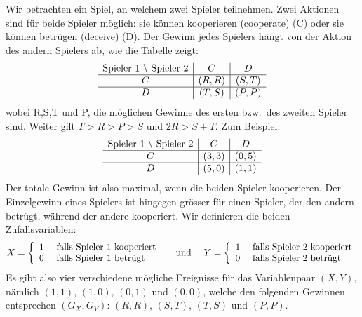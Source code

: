 \documentclass[12pt,a4paper]{article}
\begin{document}
Wir betrachten ein Spiel, an welchem zwei Spieler teilnehmen. Zwei Aktionen sind für beide Spieler möglich: sie können kooperieren (cooperate) (C) oder sie können betrügen (deceive) (D). Der Gewinn jedes Spielers hängt von der Aktion des andern Spielers ab, wie die Tabelle zeigt:
$$\begin{array}{c | c | c}
\text{Spieler 1 } \backslash \text{ Spieler 2} &  C & D \\
\hline
C &  (R,R) & (S,T) \\
\hline
D &  (T,S) & (P,P) \\
\end{array}$$
wobei R,S,T und P, die möglichen Gewinne des ersten bzw.\ des zweiten Spieler sind. Weiter gilt 
$T > R > P > S$ und $2R > S+T$. Zum Beispiel:
$$\begin{array}{c | c | c}
\text{Spieler 1 } \backslash \text{ Spieler 2} &  C & D \\
\hline
C &  (3,3) & (0,5) \\
\hline 
D &  (5,0) & (1,1) \\
\end{array}$$
Der totale Gewinn ist also maximal, wenn die beiden Spieler kooperieren. Der Einzelgewinn eines Spielers ist hingegen grösser für einen Spieler, der den andern betrügt, während der andere kooperiert. Wir definieren die beiden Zufallsvariablen:
$$X = \left\{ \begin{array}{l l}
1 & \mbox{ falls Spieler 1 kooperiert}\\
0 & \mbox{ falls Spieler 1 betrügt}\\
\end{array}\right. \quad \mbox{ und } \quad 
Y = \left\{ \begin{array}{l l}
1 & \mbox{ falls Spieler 2 kooperiert}\\
0 & \mbox{ falls Spieler 2 betrügt}\\
\end{array}\right.$$
Es gibt also vier verschiedene mögliche Ereignisse für das Variablenpaar $(X,Y)$, nämlich $(1, 1)$, $(1, 0)$, $(0, 1)$ und $(0, 0)$, welche den folgenden Gewinnen entsprechen $(G_X,G_Y)$: $(R, R)$, $(S, T)$, $(T, S)$ und $(P, P)$.\\
\end{document}
